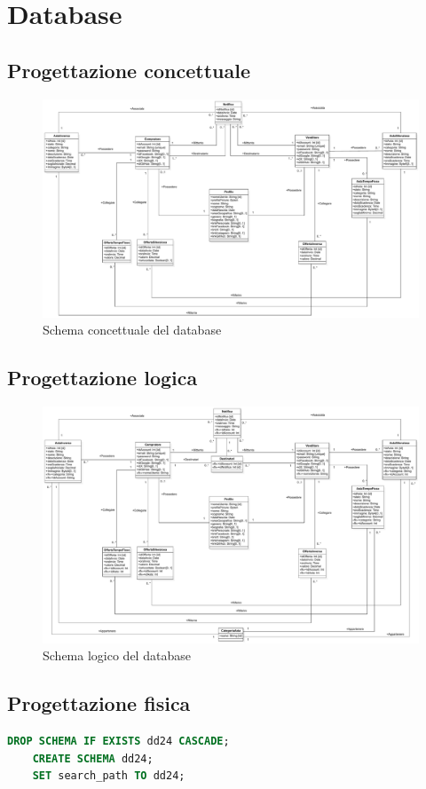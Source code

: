     \section{Database}
        \subsection{Progettazione concettuale}
            \begin{figure}[htbp!]
                \centering
                    \includegraphics[width=0.7\linewidth]{Immagini/Diagrammi/Class Diagram/ClassDiagramDatabaseRistrutturato.pdf}
                \caption{Schema concettuale del database}
                \label{fig:Schema concettuale del database}
            \end{figure}
            
        \subsection{Progettazione logica}
            \begin{figure}[htbp!]
                \centering
                    \includegraphics[width=0.7\linewidth]{Immagini/Diagrammi/Class Diagram/ClassDiagramDatabaseLogico.pdf}
                \caption{Schema logico del database}
                \label{fig:Schema logico del database}
            \end{figure}
        \subsection{Progettazione fisica}
\begin{lstlisting}[language=SQL, caption=Preparazione ambiente]
    DROP SCHEMA IF EXISTS dd24 CASCADE;
    CREATE SCHEMA dd24;
    SET search_path TO dd24;
\end{lstlisting}
            
